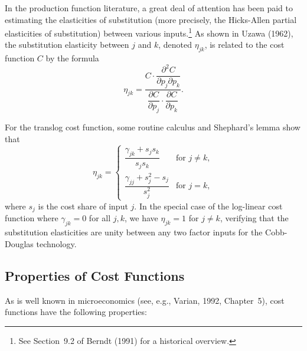 In the production function literature, a great deal of attention has been paid to
estimating the elasticities of substitution (more precisely, the Hicks-Allen partial
elasticities of substitution) between various inputs.\footnote{See Section~9.2 of
Berndt (1991) for a historical overview.}
As shown in Uzawa (1962), the substitution elasticity between $j$ and $k$,
denoted $\eta_{jk}$, is related to the cost function $C$ by the formula
\begin{equation}
\eta_{jk} = \frac{C \cdot \dfrac{\partial^2 C}{\partial p_j \partial p_k}}
{\dfrac{\partial C}{\partial p_j} \cdot \dfrac{\partial C}{\partial p_k}}.
\label{eq:4.7.8}
\end{equation}

For the translog cost function, some routine calculus and Shephard's lemma
show that
\begin{equation}
\eta_{jk} = \begin{cases}
\dfrac{\gamma_{jk} + s_j s_k}{s_j s_k} & \text{for } j \neq k, \\[10pt]
\dfrac{\gamma_{jj} + s_j^2 - s_j}{s_j^2} & \text{for } j = k,
\end{cases}
\label{eq:4.7.9}
\end{equation}
where $s_j$ is the cost share of input $j$. In the special case of the log-linear cost
function where $\gamma_{jk} = 0$ for all $j, k$, we have $\eta_{jk} = 1$ for
$j \neq k$, verifying that the substitution elasticities are unity between any two
factor inputs for the Cobb-Douglas technology.

\subsection*{Properties of Cost Functions}

As is well known in microeconomics (see, e.g., Varian, 1992, Chapter~5), cost
functions have the following properties:

